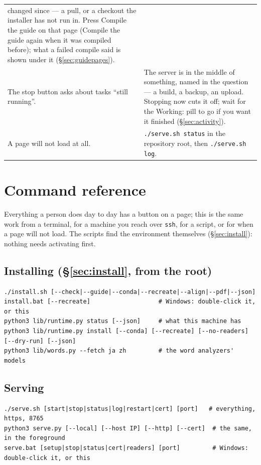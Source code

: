 \documentclass[11pt,oneside]{report}
\newcommand{\file}[1]{\texttt{#1}}
\newcommand{\menu}[1]{\textsf{#1}}
\begin{document}
\begin{center}
\begin{longtable}{@{}p{}p{}@{}}
  changed since --- a pull, or a checkout the installer has not run in. Press
  \menu{Compile the guide} on that page (\menu{Compile the guide again} when
  it was compiled before); what a failed compile said is shown under it
  (\S\ref{sec:guidepages}). \\
\addlinespace
The stop button asks about tasks ``still running''. &
  The server is in the middle of something, named in the question --- a
  build, a backup, an upload. Stopping now cuts it off; wait for the
  \menu{Working:} pill to go if you want it finished (\S\ref{sec:activity}). \\
\addlinespace
A page will not load at all. &
  \file{./serve.sh status} in the repository root, then
  \file{./serve.sh log}. \\
\bottomrule
\end{longtable}
\end{center}

\section{Command reference}

Everything a person does day to day has a button on a page; this is the
same work from a terminal, for a machine you reach over \texttt{ssh}, for a
script, or for when a page will not load. The scripts find the environment
themselves (\S\ref{sec:install}): nothing needs activating first.

\subsection*{Installing (\S\ref{sec:install}, from the root)}
\begin{lstlisting}
./install.sh [--check|--guide|--conda|--recreate|--align|--pdf|--json]
install.bat [--recreate]                   # Windows: double-click it, or this
python3 lib/runtime.py status [--json]     # what this machine has
python3 lib/runtime.py install [--conda] [--recreate] [--no-readers] [--dry-run] [--json]
python3 lib/words.py --fetch ja zh         # the word analyzers' models
\end{lstlisting}

\subsection*{Serving}
\begin{lstlisting}
./serve.sh [start|stop|status|log|restart|cert] [port]   # everything, https, 8765
python3 serve.py [--local] [--host IP] [--http] [--cert]  # the same, in the foreground
serve.bat [setup|stop|status|cert|readers] [port]         # Windows: double-click it, or this
\end{lstlisting}
\end{document}
